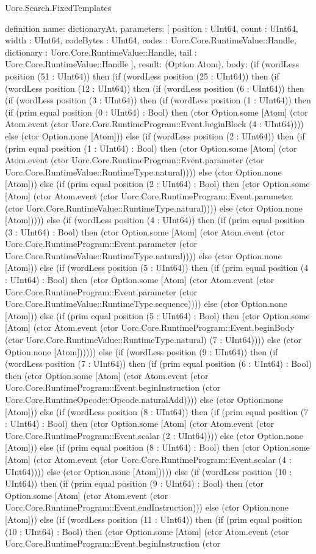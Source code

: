 \begin{lexlean}{Uorc.Search.FixedTemplates}
\begin{semanticmodule}
definition{
  name: dictionaryAt,
  parameters: [
    position : UInt64,
    count : UInt64,
    width : UInt64,
    codeBytes : UInt64,
    codes : Uorc.Core.RuntimeValue::Handle,
    dictionary : Uorc.Core.RuntimeValue::Handle,
    tail : Uorc.Core.RuntimeValue::Handle
  ],
  result: (Option Atom),
  body: (if (wordLess position (51 : UInt64)) then (if (wordLess position (25 : UInt64)) then (if (wordLess position (12 : UInt64)) then (if (wordLess position (6 : UInt64)) then (if (wordLess position (3 : UInt64)) then (if (wordLess position (1 : UInt64)) then (if (prim equal position (0 : UInt64) : Bool) then (ctor Option.some [Atom] (ctor Atom.event (ctor Uorc.Core.RuntimeProgram::Event.beginBlock (4 : UInt64)))) else (ctor Option.none [Atom])) else (if (wordLess position (2 : UInt64)) then (if (prim equal position (1 : UInt64) : Bool) then (ctor Option.some [Atom] (ctor Atom.event (ctor Uorc.Core.RuntimeProgram::Event.parameter (ctor Uorc.Core.RuntimeValue::RuntimeType.natural)))) else (ctor Option.none [Atom])) else (if (prim equal position (2 : UInt64) : Bool) then (ctor Option.some [Atom] (ctor Atom.event (ctor Uorc.Core.RuntimeProgram::Event.parameter (ctor Uorc.Core.RuntimeValue::RuntimeType.natural)))) else (ctor Option.none [Atom])))) else (if (wordLess position (4 : UInt64)) then (if (prim equal position (3 : UInt64) : Bool) then (ctor Option.some [Atom] (ctor Atom.event (ctor Uorc.Core.RuntimeProgram::Event.parameter (ctor Uorc.Core.RuntimeValue::RuntimeType.natural)))) else (ctor Option.none [Atom])) else (if (wordLess position (5 : UInt64)) then (if (prim equal position (4 : UInt64) : Bool) then (ctor Option.some [Atom] (ctor Atom.event (ctor Uorc.Core.RuntimeProgram::Event.parameter (ctor Uorc.Core.RuntimeValue::RuntimeType.sequence)))) else (ctor Option.none [Atom])) else (if (prim equal position (5 : UInt64) : Bool) then (ctor Option.some [Atom] (ctor Atom.event (ctor Uorc.Core.RuntimeProgram::Event.beginBody (ctor Uorc.Core.RuntimeValue::RuntimeType.natural) (7 : UInt64)))) else (ctor Option.none [Atom]))))) else (if (wordLess position (9 : UInt64)) then (if (wordLess position (7 : UInt64)) then (if (prim equal position (6 : UInt64) : Bool) then (ctor Option.some [Atom] (ctor Atom.event (ctor Uorc.Core.RuntimeProgram::Event.beginInstruction (ctor Uorc.Core.RuntimeOpcode::Opcode.naturalAdd)))) else (ctor Option.none [Atom])) else (if (wordLess position (8 : UInt64)) then (if (prim equal position (7 : UInt64) : Bool) then (ctor Option.some [Atom] (ctor Atom.event (ctor Uorc.Core.RuntimeProgram::Event.scalar (2 : UInt64)))) else (ctor Option.none [Atom])) else (if (prim equal position (8 : UInt64) : Bool) then (ctor Option.some [Atom] (ctor Atom.event (ctor Uorc.Core.RuntimeProgram::Event.scalar (4 : UInt64)))) else (ctor Option.none [Atom])))) else (if (wordLess position (10 : UInt64)) then (if (prim equal position (9 : UInt64) : Bool) then (ctor Option.some [Atom] (ctor Atom.event (ctor Uorc.Core.RuntimeProgram::Event.endInstruction))) else (ctor Option.none [Atom])) else (if (wordLess position (11 : UInt64)) then (if (prim equal position (10 : UInt64) : Bool) then (ctor Option.some [Atom] (ctor Atom.event (ctor Uorc.Core.RuntimeProgram::Event.beginInstruction (ctor }
\end{semanticmodule}
\end{lexlean}
